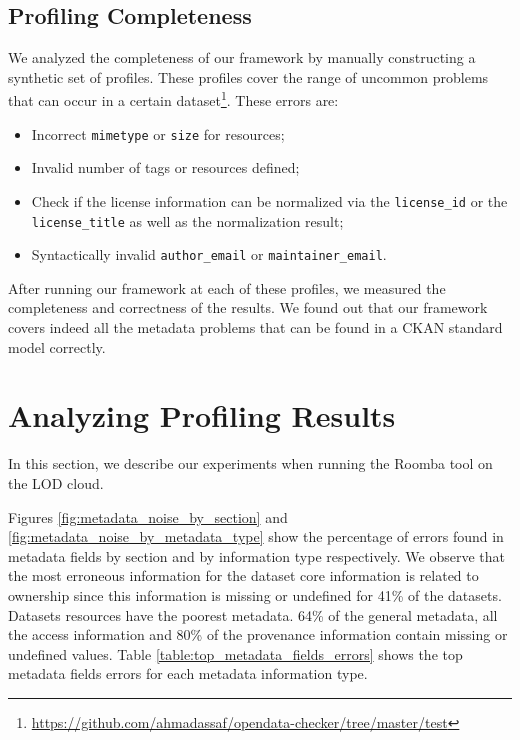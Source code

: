 \subsection{Profiling Completeness}
We analyzed the completeness of our framework by manually constructing a synthetic set of profiles. These profiles cover the range of uncommon problems that can occur in a certain dataset\footnote{\url{https://github.com/ahmadassaf/opendata-checker/tree/master/test}}. These errors are:
\begin{itemize}
 \item Incorrect \texttt{mimetype} or \texttt{size} for resources;
 \item Invalid number of tags or resources defined;
 \item Check if the license information can be normalized via the \texttt{license\_id} or the \texttt{license\_title} as well as the normalization result;
 \item Syntactically invalid \texttt{author\_email} or \texttt{maintainer\_email}.
\end{itemize}

After running our framework at each of these profiles, we measured the completeness and correctness of the results. We found out that our framework covers indeed all the metadata problems that can be found in a CKAN standard model correctly.

\section{Analyzing Profiling Results} \label{section:running_roomba}

In this section, we describe our experiments when running the Roomba tool on the LOD cloud.

Figures \ref{fig:metadata_noise_by_section} and \ref{fig:metadata_noise_by_metadata_type} show the percentage of errors found in metadata fields by section and by information type respectively. We observe that the most erroneous information for the dataset core information is related to ownership since this information is missing or undefined for 41\% of the datasets. Datasets resources have the poorest metadata. 64\% of the general metadata, all the access information and 80\% of the provenance information contain missing or undefined values. Table \ref{table:top_metadata_fields_errors} shows the top metadata fields errors for each metadata information type.

